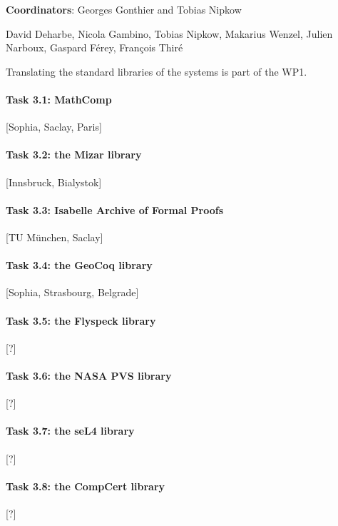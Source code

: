 {\bf Coordinators}: Georges Gonthier and Tobias Nipkow 

David Deharbe, Nicola Gambino, Tobias Nipkow, Makarius Wenzel,
Julien Narboux, Gaspard Férey, François Thiré

Translating the standard libraries of the systems is part of the WP1. 

\paragraph{Task 3.1: MathComp}

 [Sophia, Saclay, Paris]

\paragraph{Task 3.2: the Mizar library}

[Innsbruck, Bialystok]

\paragraph{Task 3.3: Isabelle Archive of Formal Proofs}

[TU München, Saclay]

\paragraph{Task 3.4: the GeoCoq library}

[Sophia, Strasbourg, Belgrade]

\paragraph{Task 3.5: the Flyspeck library} 

[?]

\paragraph{Task 3.6: the NASA PVS library} 

[?]

\paragraph{Task 3.7: the seL4 library}

[?]

\paragraph{Task 3.8: the CompCert library}

[?]
